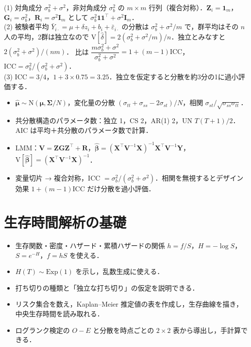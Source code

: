 \documentclass[a4paper,11pt,openany]{ltjsbook}
\newenvironment{kaitou}[1]{%
  \par\medskip\noindent
  \begin{tcolorbox}[enhanced,breakable,colback=bkgray!3,colframe=bkgray!60,boxrule=0.4pt,
    left=4pt,right=4pt,top=2pt,bottom=2pt,arc=1pt,
    title={\cref{#1}の解答},fonttitle=\bfseries\small,coltitle=white,colbacktitle=bkgray!80]}%
  {\end{tcolorbox}\par}
\newcommand{\V}{\mathrm{V}}
\newcommand{\Normal}{\mathrm{N}}
\newcommand{\Ex}{\mathrm{Exp}}
\newcommand{\transp}{^{\top}}
\begin{document}
\begin{kaitou}{reidai:08-2}
(1) 対角成分 $\sigma_b^2+\sigma^2$，非対角成分 $\sigma_b^2$ の $m\times m$ 行列（複合対称）．$\bm Z_i=\bm1_m$，$\bm G_i=\sigma_b^2$，$\bm R_i=\sigma^2\bm I_m$ として $\sigma_b^2\bm1\bm1\transp+\sigma^2\bm I_m$．\\
(2) 被験者平均 $\bar Y_{i\cdot}=\mu+\delta z_i+b_i+\bar\varepsilon_{i\cdot}$ の分散は $\sigma_b^2+\sigma^2/m$ で，群平均はその $n$ 人の平均，2群は独立なので
$\V[\hat\delta]=2(\sigma_b^2+\sigma^2/m)/n$．独立とみなすと $2(\sigma_b^2+\sigma^2)/(nm)$．
比は $\dfrac{m\sigma_b^2+\sigma^2}{\sigma_b^2+\sigma^2}=1+(m-1)\mathrm{ICC}$，$\mathrm{ICC}=\sigma_b^2/(\sigma_b^2+\sigma^2)$．\\
(3) $\mathrm{ICC}=3/4$，$1+3\times0.75=3.25$．独立を仮定すると分散を約3分の1に過小評価する．
\end{kaitou}

\begin{summarybox}
\begin{itemize}
\item $\hat{\bm\mu}\sim\Normal(\bm\mu,\bm\Sigma/N)$，変化量の分散 $(\sigma_{tt}+\sigma_{ss}-2\sigma_{st})/N$，相関 $\sigma_{st}/\sqrt{\sigma_{ss}\sigma_{tt}}$．
\item 共分散構造のパラメータ数：独立 1，CS 2，AR(1) 2，UN $T(T+1)/2$．AIC は平均＋共分散のパラメータ数で計算．
\item LMM：$\bm V=\bm Z\bm G\bm Z\transp+\bm R$，$\hat{\bm\beta}=(\bm X\transp\bm V^{-1}\bm X)^{-1}\bm X\transp\bm V^{-1}\bm Y$，$\V[\hat{\bm\beta}]=(\bm X\transp\bm V^{-1}\bm X)^{-1}$．
\item 変量切片 → 複合対称，ICC $=\sigma_b^2/(\sigma_b^2+\sigma^2)$．相関を無視するとデザイン効果 $1+(m-1)\mathrm{ICC}$ だけ分散を過小評価．
\end{itemize}
\end{summarybox}

\chapter{生存時間解析の基礎}\label{ch:09}

\begin{goalbox}
\begin{itemize}
\item 生存関数・密度・ハザード・累積ハザードの関係 $h=f/S$，$H=-\log S$，$S=e^{-H}$，$f=hS$ を使える．
\item $H(T)\sim\Ex(1)$ を示し，乱数生成に使える．
\item 打ち切りの種類と「独立な打ち切り」の仮定を説明できる．
\item リスク集合を数え，Kaplan--Meier 推定値の表を作成し，生存曲線を描き，中央生存時間を読み取れる．
\item ログランク検定の $O-E$ と分散を時点ごとの $2\times2$ 表から導出し，手計算できる．
\end{itemize}
\end{goalbox}
\end{document}
